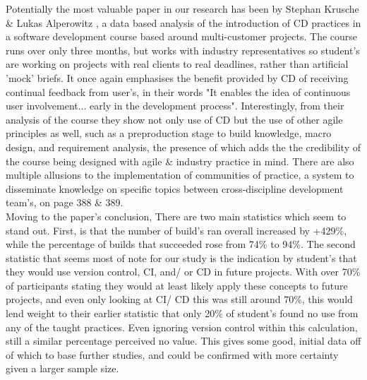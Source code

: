 \documentclass[journal]{IEEEtran}
\begin{document}
Potentially the most valuable paper in our research has been by Stephan Krusche \& Lukas Alperowitz \cite{CDCourse2014}, a data based analysis of the introduction of CD practices in a software development course based around multi-customer projects. The course runs over only three months, but works with industry representatives so student's are working on projects with real clients to real deadlines, rather than artificial 'mock' briefs. It once again emphasises the benefit provided by CD of receiving continual feedback from user's, in their words "It enables the idea of continuous user involvement... early in the development process"\cite[p.338]{CDCourse2014}. Interestingly, from their analysis of the course they show not only use of CD but the use of other agile principles as well, such as a preproduction stage to build knowledge\cite[p.338]{CDCourse2014}, macro design\cite[timestamp 28:20]{caernymethod}, and requirement analysis, the presence of which adds the the credibility of the course being designed with agile \& industry practice in mind. There are also multiple allusions to the implementation of communities of practice\cite{agilewithscrum}, a system to disseminate knowledge on specific topics between cross-discipline development team's, on page 388 \& 389. \\
Moving to the paper's conclusion, There are two main statistics which seem to stand out. First, is that the number of build's ran overall increased by +429\%\cite[p.342]{CDCourse2014}, while the percentage of builds that succeeded rose from 74\% to 94\%. The second statistic that seems most of note for our study is the indication by student's that they would use version control, CI, and/ or CD in future projects. With over 70\% of participants stating they would at least likely apply these concepts to future projects\cite[p.342]{CDCourse2014}, and even only looking at CI/ CD this was still around 70\%, this would lend weight to their earlier statistic that only 20\% of  student's found no use from any of the taught practices. Even ignoring version control within this calculation, still a similar percentage perceived no value. This gives some good, initial data off of which to base further studies, and could be confirmed with more certainty given a larger sample size.
\end{document}
